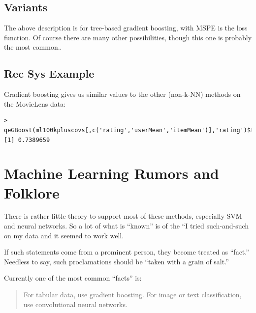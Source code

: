 \subsection{Variants}

The above description is for tree-based gradient boosting, with
MSPE is the loss function.  Of course there are many other
possibilities, though this one is probably the most common..

\subsection{Rec Sys Example}

Gradient boosting gives us similar values to the other (non-k-NN)
methods on the MovieLens data:

\begin{lstlisting}
> qeGBoost(ml100kpluscovs[,c('rating','userMean','itemMean')],'rating')$testAcc
[1] 0.7389659
\end{lstlisting}

\section{Machine Learning Rumors and Folklore}

There is rather little theory to support most of these methods,
especially SVM and neural networks.  So a lot of what is ``known'' is of
the ``I tried such-and-such on my data and it seemed to work well.

If such statements come from a prominent person, they become treated as
``fact.''  Needless to say, such proclamations should be ``taken with a
grain of salt.''

Currently one of the most common ``facts'' is:

\begin{quote}

For tabular data, use gradient boosting.  For image or text
classification, use convolutional neural networks.
\end{quote}

